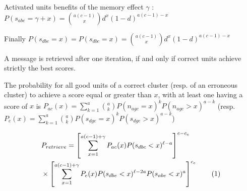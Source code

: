 \documentclass[english,10pt,twocolumn]{IEEEtran}
\newcommand\numberthis{\addtocounter{equation}{1}\tag{\theequation}}
\theoremstyle{definition}
\begin{document}
	Activated units benefits of the memory effect $\gamma$ :	\\
	$P(s_{abe} = \gamma + x) = {a(c - 1) \choose x} d^x (1-d)^{a(c-1)-x}$
	
	
	Finally $P(s_{dbe} = x) = P(s_{dbc} = x) = {a(c - 1) \choose x} d^x (1-d)^{a(c- 1) -x}$	
	
	A message is retrieved after one iteration, if and only if correct units achieve strictly the best scores.	
	
	

	
	
	
	
	The probability for all good units of a correct cluster (resp. of an erroneous cluster) to achieve a score equal or greater than $x$, with at least one having a score of $x$ is $P_{ac} (x) = \sum_{k = 1}^{a} { a \choose k }   P(n_{agc} = x)^k P(n_{agc} > x)^{a-k}$ (resp. $P_e(x) = \sum_{k = 1}^a { a \choose k } P(s_{dge} = x)^k P(s_{dge} > x)^{a-k}$)

	
	
		\begin{align*}
	&P_{retrieve} = \left [ \sum_{x = 1}^{a(c-1) + \gamma} P_{ac}(x) P(s_{dbc} < x)^{\ell-a} \right ]^{c - c_e}\\ 
	 &\times \left [ \sum_{x = 1}^{a(c-1) +\gamma} P_e(x) P(s_{dbe} < x)^{\ell-2a} P(s_{abe} < x)^a \right ]^{c_e} \numberthis \label{from_err_th}
	\end{align*}
	
\end{document}

